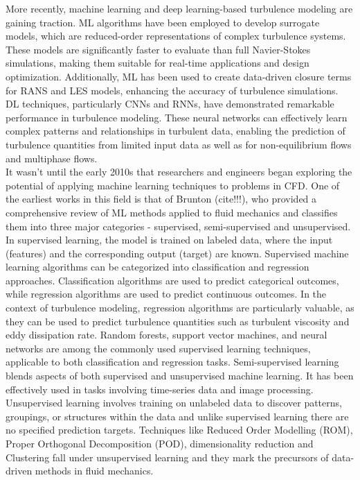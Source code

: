 More recently, machine learning and deep learning-based turbulence modeling are gaining traction. ML algorithms have been employed to develop surrogate models, which are reduced-order representations of complex turbulence systems. These models are significantly faster to evaluate than full Navier-Stokes simulations, making them suitable for real-time applications and design optimization. Additionally, ML has been used to create data-driven closure terms for RANS and LES models, enhancing the accuracy of turbulence simulations. DL techniques, particularly CNNs and RNNs, have demonstrated remarkable performance in turbulence modeling. These neural networks can effectively learn complex patterns and relationships in turbulent data, enabling the prediction of turbulence quantities from limited input data as well as for non-equilibrium flows and multiphase flows. \\
It wasn't until the early 2010s that researchers and engineers began exploring the potential of applying machine learning techniques to problems in CFD. One of the earliest works in this field is that of Brunton (cite!!!), who provided a comprehensive review of ML methods applied to fluid mechanics and classifies them into three major categories - supervised, semi-supervised and unsupervised. In supervised learning, the model is trained on labeled data, where the input (features) and the corresponding output (target) are known. Supervised machine learning algorithms can be categorized into classification and regression approaches. Classification algorithms are used to predict categorical outcomes, while regression algorithms are used to predict continuous outcomes. In the context of turbulence modeling, regression algorithms are particularly valuable, as they can be used to predict turbulence quantities such as turbulent viscosity and eddy dissipation rate. Random forests, support vector machines, and neural networks are among the commonly used supervised learning techniques, applicable to both classification and regression tasks. Semi-supervised learning blends aspects of both supervised and unsupervised machine learning. It has been effectively used in tasks involving time-series data and image processing. Unsupervised learning involves training on unlabeled data to discover patterns, groupings, or structures within the data and unlike supervised learning there are no specified prediction targets. Techniques like Reduced Order Modelling (ROM), Proper Orthogonal Decomposition (POD), dimensionality reduction and Clustering fall under unsupervised learning and they mark the precursors of data-driven methods in fluid mechanics. \\
